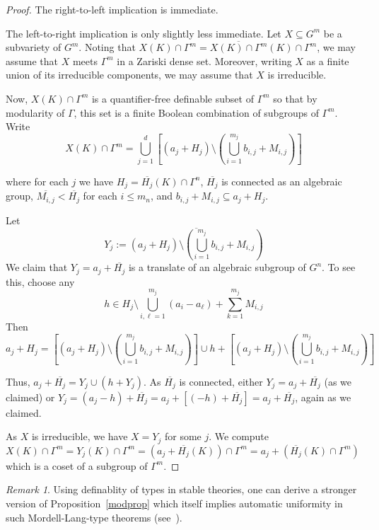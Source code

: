 \documentclass{amsart}
\theoremstyle{definition}
\theoremstyle{remark}
\newtheorem{Rk}[thm]{Remark}
\begin{document}
\begin{proof}
The right-to-left implication is immediate.  

The left-to-right implication is only slightly less immediate. Let $X \subseteq G^m$ be 
a subvariety of $G^m$.   Noting that 
$X(K) \cap \Gamma^m = \overline{X(K) \cap \Gamma^m}(K) \cap \Gamma^m$, 
we may assume that $X$ meets $\Gamma^m$ in a Zariski dense set.  Moreover, 
writing $X$ as a finite union of its irreducible components, we may assume that 
$X$ is irreducible.  


Now, $X(K) \cap \Gamma^m$ is a quantifier-free definable subset of 
$\Gamma^m$ so that by modularity of $\Gamma$, this set is a finite Boolean combination of 
subgroups of $\Gamma^m$.  Write
$$X(K) \cap \Gamma^m = \bigcup_{j=1}^d [(a_j + H_j) \setminus (\bigcup_{i=1}^{m_j} b_{i,j} + M_{i,j})]$$

where for each $j$ we have $H_j = \overline{H_j}(K) \cap \Gamma^n$, $\overline{H_j}$ is connected 
as an algebraic group, $\overline{M_{i,j}} < \overline{H_j}$ for each $i \leq m_n$,
 and $b_{i,j} + M_{i,j} \subseteq a_j + H_j$.  

Let $$Y_j := \overline{(a_j + H_j) \setminus (\bigcup_{i=1}^{m_j} b_{i,j} + M_{i,j})}$$  
We claim that $Y_j = a_j + \overline{H_j}$ is a translate of an algebraic subgroup of $G^n$.
To see this, choose any 
$$h \in H_j \setminus \bigcup_{i,\ell=1}^{m_j} (a_i - a_\ell) + \sum_{k=1}^{m_j} M_{i,j}$$
Then 
$$a_j + H_j = [(a_j + H_j) \setminus (\bigcup_{i=1}^{m_j} b_{i,j} + M_{i,j})] \cup 
		h + [(a_j + H_j) \setminus (\bigcup_{i=1}^{m_j} b_{i,j} + M_{i,j})]$$

Thus, $a_j + \overline{H_j} = Y_j \cup (h + Y_j)$.  As $\overline{H_j}$ is connected, 
either $Y_j = a_j + \overline{H_j}$ (as we claimed) or $Y_j = (a_j - h) + \overline{H_j} = 
	a_j + [(-h) + \overline{H_j}] = a_j + \overline{H_j}$, again as we claimed.

As $X$ is irreducible, we have $X = Y_j$ for some $j$.   We compute
$X(K) \cap \Gamma^m = Y_j(K) \cap \Gamma^m = (a_j + \overline{H_j}(K)) \cap \Gamma^m = 
	a_j + (\overline{H_j}(K) \cap \Gamma^m)$ which is a coset of a subgroup of $\Gamma^m$.
\end{proof}


\begin{Rk}
Using definablity of types in stable theories, one can derive a stronger 
version of Proposition~\ref{modprop} which itself implies automatic 
uniformity in such Mordell-Lang-type theorems (see~\cite{PiMTML, HrMM, Scuni}).
\end{Rk}
\end{document}
